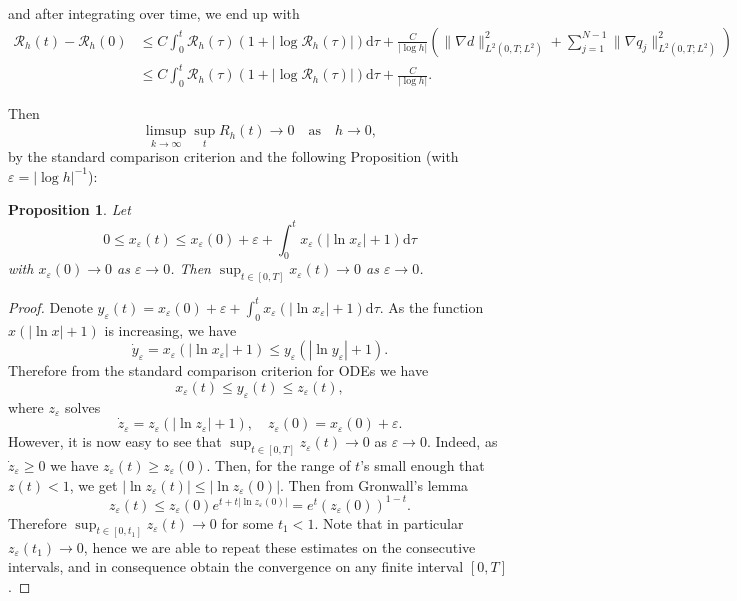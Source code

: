 \documentclass[11pt]{article}
\newcommand{\dd}{\mathrm{d}}
\newtheorem{prop}[tw]{Proposition}
\numberwithin{equation}{section}
\numberwithin{tw}{section}
\begin{document}
and after integrating over time, we end up with
\[\begin{aligned} \mathcal{R}_h(t) - \mathcal{R}_h(0) &\leq C\int_0^t \mathcal{R}_h(\tau)(1+|\log \mathcal{R}_h(\tau)|)\dd\tau + \frac{C}{|\log h|}\left(\|\nabla d\|_{L^2(0,T;L^2)}^2+\sum_{j=1}^{N-1}\|\nabla q_j\|_{L^2(0,T;L^2)}^2\right) \\
&\leq C\int_0^t \mathcal{R}_h(\tau)(1+|\log \mathcal{R}_h(\tau)|)\dd\tau + \frac{C}{|\log h|}.
\end{aligned}\]

Then
\[ \limsup_{k\to\infty}\sup_t R_h(t) \to 0 \quad \text{as} \quad h\to 0, \]
by the standard comparison criterion and the following Proposition (with $\varepsilon=|\log h|^{-1}$):
\begin{prop}
Let 
\[ 0\leq x_\varepsilon(t)\leq x_\varepsilon(0)+\varepsilon + \int_0^t x_\varepsilon(|\ln x_\varepsilon|+1)\dd\tau \]
with $x_\varepsilon(0)\to 0$ as $\varepsilon\to 0$.
Then $\displaystyle\sup_{t\in [0,T]} x_\varepsilon(t) \to 0$ as $\varepsilon\to 0$.
\end{prop}
\begin{proof}
Denote $\displaystyle y_\varepsilon(t) = x_\varepsilon(0)+\varepsilon + \int_0^t x_\varepsilon(|\ln x_\varepsilon|+1)\dd\tau$. As the function $x(|\ln x|+1)$ is increasing, we have
\[ \dot y_\varepsilon = x_\varepsilon(|\ln x_\varepsilon|+1) \leq y_\varepsilon(|\ln y_\varepsilon|+1). \]
Therefore from the standard comparison criterion for ODEs we have
\[ x_\varepsilon(t) \leq y_\varepsilon(t) \leq z_\varepsilon(t), \]
where $z_\varepsilon$ solves
\[ \dot z_\varepsilon = z_\varepsilon(|\ln z_\varepsilon|+1), \quad z_\varepsilon(0)=x_\varepsilon(0)+\varepsilon. \]
However, it is now easy to see that $\displaystyle \sup_{t\in [0,T]}z_\varepsilon(t)\to 0$ as $\varepsilon\to 0$. Indeed, as $\dot{z}_\varepsilon\geq 0$ we have $z_\varepsilon(t)\geq z_\varepsilon(0)$. Then, for the range of $t$'s small enough that $z(t)<1$, we get $|\ln z_\varepsilon(t)|\leq |\ln z_\varepsilon(0)|$. Then from Gronwall's lemma
\[ z_\varepsilon(t)\leq z_\varepsilon(0)e^{t+t|\ln z_\varepsilon(0)|} = e^t(z_\varepsilon(0))^{1-t}. \]
Therefore $\sup_{t\in [0,t_1]}z_\varepsilon(t)\to 0$ for some $t_1<1$. Note that in particular $z_\varepsilon(t_1)\to 0$, hence we are able to repeat these estimates on the consecutive intervals, and in consequence obtain the convergence on any finite interval $[0,T]$.
\end{proof}
\end{document}
